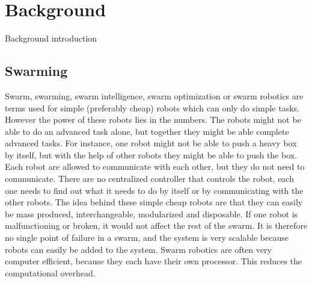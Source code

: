 \section{Background}
Background introduction

\subsection{Swarming}
Swarm, swarming, swarm intelligence, swarm optimization or swarm robotics are terms used for simple (preferably cheap) robots which can only do simple tasks. However the power of these robots lies in the numbers. The robots might not be able to do an advanced task alone, but together they might be able complete advanced tasks. For instance, one robot might not be able to push a heavy box by itself, but with the help of other robots they might be able to push the box.
Each robot are allowed to communicate with each other, but they do not need to communicate. There are no centralized controller that controls the robot, each one needs to find out what it needs to do by itself or by communicating with the other robots. The idea behind these simple cheap robots are that they can easily be mass produced, interchangeable, modularized and disposable. If one robot is malfunctioning or broken, it would not affect the rest of the swarm. It is therefore no single point of failure in a swarm, and the system is very scalable because robots can easily be added to the system.
Swarm robotics are often very computer efficient, because they each have their own processor. This reduces the computational overhead. 


